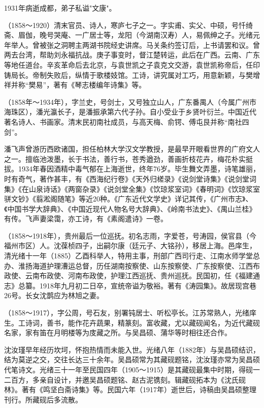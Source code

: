 \begin{description}
        1931年病逝成都，弟子私谥"文康"。
  \item[易顺鼎] （1858～1920）清末官员、诗人，寒庐七子之一。字实甫、实父、中硕，号忏绮斋、眉伽，晚号哭庵、一广居士等，龙阳（今湖南汉寿）人，易佩绅之子。光绪元年举人。曾被张之洞聘主两湖书院经史讲席。马关条约签订后，上书请罢和议。曾两去台湾，帮助刘永福抗战。庚子事变时，督江楚转运，此后在广西。云南、广东等地任道台。辛亥革命后去北京，与袁世凯之子袁克文交游，袁世凯称帝后，任印铸局长。帝制失败后，纵情于歌楼妓馆。工诗，讲究属对工巧，用意新颖，与樊增祥并称“樊易”，著有《琴志楼编年诗集》等。
  \item[潘飞声] （1858年～1934年），字兰史，号剑士，又号独立山人，广东番禺人（今属广州市海珠区），潘光瀛长子，是潘振承第六代子孙。自小受业于乡贤叶衍兰。中国近代著名诗人、书画家。清末民初南社成员，与高天梅、俞锷、傅屯艮并称“南社四剑”。\par
        潘飞声曾游历西欧诸国，担任柏林大学汉文学教授，是最早开眼看世界的广府文人之一。擅临池泼墨，长于书法，善行书，苍秀遒劲，善画折枝花卉，梅花朴实挺拔。1934年春因酒精中毒气郁在上海逝世，终年76岁。毕生舞文弄墨，诗笔雄丽，时有奇气，著作甚丰，有《西海纪行卷》《天外归槎录》《说剑堂诗集》《说剑堂词集》《在山泉诗话》《两窗杂录》《说剑堂全集》《饮琼浆室词》《春明词》《饮琼浆室骈文钞》《翦淞阁随笔》等近20种。《广东近代文学史》详记其传，《广州市志》、《中国书学大辞典》、《中国近现代人物名号大辞典》、《岭南书法史》、《禺山兰桂》有传。飞声妻梁霭，亦工诗，有《素阁遣诗》一卷。
  \item[沈瑜庆] （1858～1918年），贵州最后一位巡抚。初名志雨，字爱苍，号涛园，侯官县（今福州市区）人。沈葆桢四子，出嗣尔康（廷元子、大铭孙），移居上海。邑庠生，清光绪十一年（1885）乙酉科举人，特用主事，刑部广西司行走、江南水师学堂总办、淮扬海道护理漕运总督，历任湖南按察使、山东按察使、广东按察使、江西布政使、云南布政使、河南布政使，护理江西巡抚、贵州巡抚。民国初，任《福建通志》总纂。1918年九月初二日卒，宣统帝谥为敬裕。著有《涛园集》。故居现宫巷26号。长女沈鹊应为林旭之妻。
  \item[沈汝瑾] （1858～1917），字公周，号石友，别署钝居士、听松亭长。江苏常熟人，光绪庠生。工诗词，善书，能作花卉蔬果，精篆刻。富收藏，尤以藏砚闻名，为近代藏砚名家，家有笛在月明楼等为庋藏之所。与吴昌硕、蒲华等时相往还合作。\par
        沈汝瑾早年经历坎坷，怀抱热情而未能入世。光绪八年（1882年）与吴昌硕结识，结为莫逆之交，交往长达三十余年。吴昌硕常为其藏砚题铭，沈汝瑾亦常为吴昌硕代笔诗文。光绪三十一年至民国四年（1905～1915）是其藏砚最集中时期，得砚一二百方，多亲自设计，并邀吴昌硕题铭、赵古泥镌刻。辑藏砚拓本为《沈氏砚林》。著有《鸣坚白斋诗集》等。民国六年（1917年）逝世后，诗稿由吴昌硕整理刊行。所藏砚后多流散。

\end{description}

